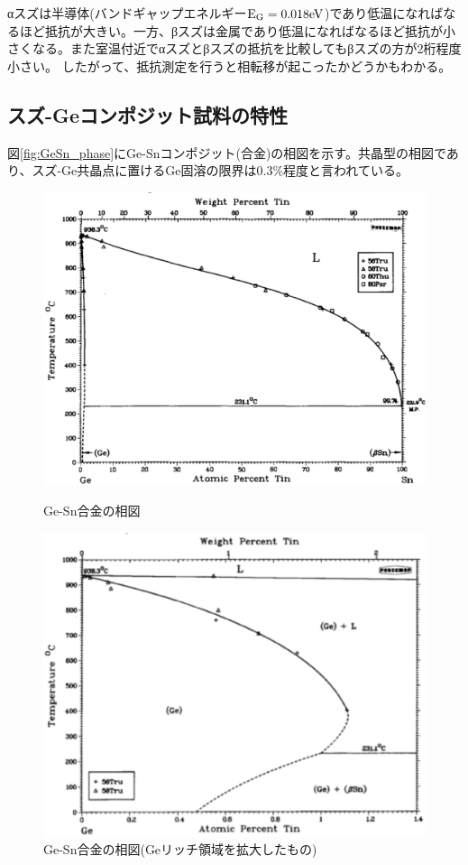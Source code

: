 αスズは半導体(バンドギャップエネルギー$\rm E_G=0.018eV$)であり低温になればなるほど抵抗が大きい。一方、βスズは金属であり低温になればなるほど抵抗が小さくなる。また室温付近でαスズとβスズの抵抗を比較してもβスズの方が2桁程度小さい。\cite{} したがって、抵抗測定を行うと相転移が起こったかどうかもわかる。



\subsection{スズ-Geコンポジット試料の特性}
図\ref{fig:GeSn_phase}にGe-Snコンポジット(合金)の相図を示す\cite{Olesinski1984}。共晶型の相図であり、スズ-Ge共晶点に置けるGe固溶の限界は0.3\%程度と言われている\cite{Thurmond1960}。
\begin{figure}[!h]
 \begin{minipage}{\hsize}
    \begin{center}
   \includegraphics[width=0.8\hsize]{Introduction/GeSn_phase.eps}
  \end{center}
  \caption{Ge-Sn合金の相図\cite{Olesinski1984}}
  \label{fig:GeSn_phase}
 \end{minipage}
 \begin{minipage}{\hsize}
    \begin{center}
   \includegraphics[width=0.8\hsize]{Introduction/GeSn_phase2.eps}
  \end{center}
  \caption{Ge-Sn合金の相図(Geリッチ領域を拡大したもの)\cite{Olesinski1984}}
  \label{fig:GeSn_phase2}
   \end{minipage}
\end{figure}

